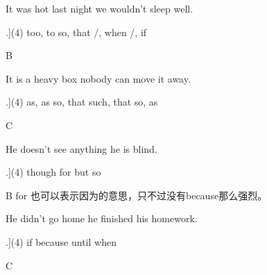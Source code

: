 \documentclass[a4paper]{article}
\begin{document}
\begin{question}
 It was \blank[width=1cm]{} hot last night \blank[width=1cm]{} we wouldn't sleep well.

   \begin{tasks}[counter-format=tsk[A].](4)
              \task too, to
              \task so, that
              \task /, when
              \task /, if
   \end{tasks}

\end{question}
\begin{solution}
B
\end{solution}

\begin{question}
 It is \blank[width=1cm]{} a heavy box \blank[width=1cm]{} nobody can move it away.

   \begin{tasks}[counter-format=tsk[A].](4)
              \task as, as
              \task so, that
              \task such, that
              \task so, as
   \end{tasks}

\end{question}
\begin{solution}
C
\end{solution}

\begin{question}
 He doesn't see anything \blank[width=1cm]{} he is blind.

   \begin{tasks}[counter-format=tsk[A].](4)
              \task though
              \task for
              \task but
              \task so
   \end{tasks}

\end{question}
\begin{solution}
B for 也可以表示因为的意思，只不过没有because那么强烈。
\end{solution}

\begin{question}
 He didn't go home \blank[width=1cm]{} he finished his homework.

   \begin{tasks}[counter-format=tsk[A].](4)
              \task if
              \task because
              \task until
              \task when
   \end{tasks}

\end{question}
\begin{solution}
C
\end{solution}
\end{document}
